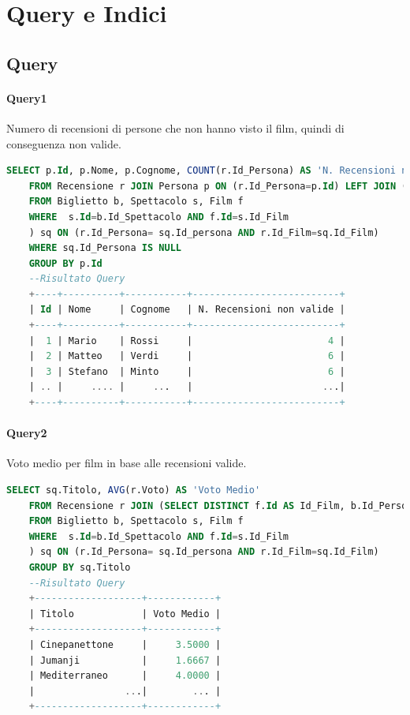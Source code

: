 \documentclass[10pt]{article}
\begin{document}
	\section{Query e Indici}
	\subsection{Query}
	\paragraph{Query1}
	Numero di recensioni di persone che non hanno visto il film, quindi di conseguenza non valide.		
	\begin{lstlisting}[language=SQL]
	SELECT p.Id, p.Nome, p.Cognome, COUNT(r.Id_Persona) AS 'N. Recensioni non valide'
	FROM Recensione r JOIN Persona p ON (r.Id_Persona=p.Id) LEFT JOIN (SELECT DISTINCT f.Id AS Id_Film, b.Id_Persona AS Id_Persona, f.Titolo as Titolo
	FROM Biglietto b, Spettacolo s, Film f
	WHERE  s.Id=b.Id_Spettacolo AND f.Id=s.Id_Film
	) sq ON (r.Id_Persona= sq.Id_persona AND r.Id_Film=sq.Id_Film)
	WHERE sq.Id_Persona IS NULL
	GROUP BY p.Id	
	--Risultato Query
	+----+----------+-----------+--------------------------+
	| Id | Nome     | Cognome   | N. Recensioni non valide |
	+----+----------+-----------+--------------------------+
	|  1 | Mario    | Rossi     |                        4 |
	|  2 | Matteo   | Verdi     |                        6 |
	|  3 | Stefano  | Minto     |                        6 |
	| .. |     .... |     ...   |                       ...|
	+----+----------+-----------+--------------------------+	
	\end{lstlisting}
	\pagebreak
	\paragraph{Query2}
	Voto medio per film in base alle recensioni valide.
	\begin{lstlisting}[language=SQL]
	SELECT sq.Titolo, AVG(r.Voto) AS 'Voto Medio'
	FROM Recensione r JOIN (SELECT DISTINCT f.Id AS Id_Film, b.Id_Persona AS Id_Persona, f.Titolo as Titolo
	FROM Biglietto b, Spettacolo s, Film f
	WHERE  s.Id=b.Id_Spettacolo AND f.Id=s.Id_Film
	) sq ON (r.Id_Persona= sq.Id_persona AND r.Id_Film=sq.Id_Film)
	GROUP BY sq.Titolo	
	--Risultato Query
	+-------------------+------------+
	| Titolo            | Voto Medio |
	+-------------------+------------+
	| Cinepanettone     |     3.5000 |
	| Jumanji           |     1.6667 |
	| Mediterraneo      |     4.0000 |
	|                ...|        ... |
	+-------------------+------------+	
	\end{lstlisting}
\end{document}
